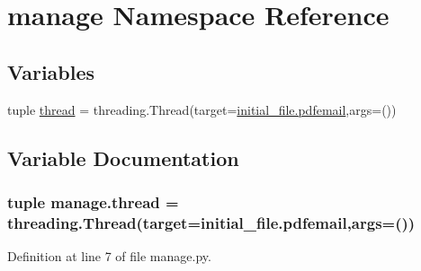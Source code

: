 \hypertarget{namespacemanage}{}\section{manage Namespace Reference}
\label{namespacemanage}
\subsection*{Variables}
\begin{DoxyCompactItemize}
\item 
tuple \hyperlink{namespacemanage_ab0c13dd165a5c8a6f3e3c029a2acd921}{thread} = threading.\+Thread(target=\hyperlink{namespaceinitial__file_a105b1aa7bf4db853b6f4d064ed224030}{initial\+\_\+file.\+pdfemail},args=())
\end{DoxyCompactItemize}


\subsection{Variable Documentation}
\hypertarget{namespacemanage_ab0c13dd165a5c8a6f3e3c029a2acd921}{}
\subsubsection[{thread}]{\setlength{\rightskip}{0pt plus 5cm}tuple manage.\+thread = threading.\+Thread(target={\bf initial\+\_\+file.\+pdfemail},args=())}\label{namespacemanage_ab0c13dd165a5c8a6f3e3c029a2acd921}


Definition at line 7 of file manage.\+py.

